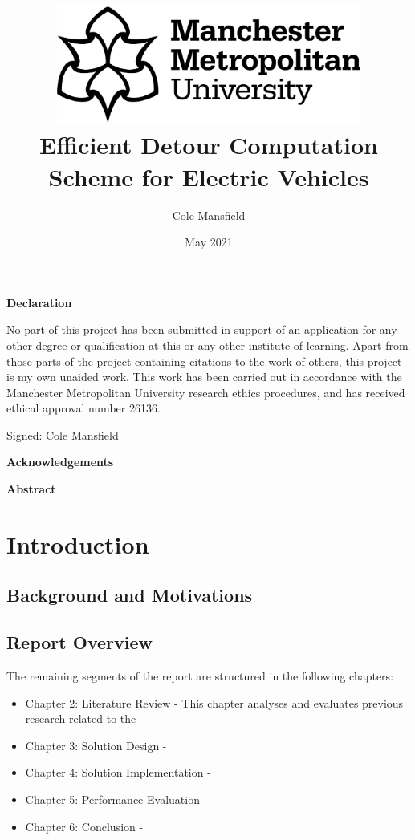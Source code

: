 \documentclass[11pt]{report}
\title{\includegraphics[width=10cm]{mmuLogo.png}\\Efficient Detour Computation Scheme for Electric Vehicles}
\author{Cole Mansfield}
\date{May 2021}
\begin{document}
\begin{titlepage}
\maketitle
\end{titlepage}


\begin{center}
  \normalsize\textbf{Declaration}
\end{center}
No part of this project has been submitted in support of an application for any other degree or qualification at this or any other institute of learning. Apart from those parts of the project containing citations to the work of others, this project is my own unaided work. This work has been carried out in accordance with the Manchester Metropolitan University research ethics procedures, and has received ethical approval number 26136.

\noindent
Signed: Cole Mansfield
\newpage

\begin{center}
  \normalsize\textbf{Acknowledgements}
\end{center}
\newpage

\begin{center}
  \normalsize\textbf{Abstract}
\end{center}
\newpage

\tableofcontents
\newpage

\glsaddall
\printglossary[type=\acronymtype]
\newpage

\chapter{Introduction}

\newpage

\section{Background and Motivations}



\section{Report Overview}

The remaining segments of the report are structured in the following chapters:

\begin{itemize}
  \item Chapter 2: Literature Review - This chapter analyses and evaluates previous research related to the
  \item Chapter 3: Solution Design - 
  \item Chapter 4: Solution Implementation - 
  \item Chapter 5: Performance Evaluation - 
  \item Chapter 6: Conclusion - 
\end{itemize}
\end{document}

